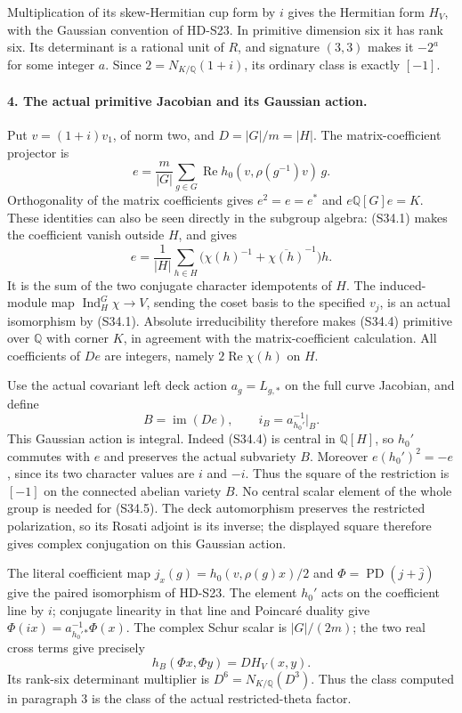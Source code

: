 Multiplication of its skew-Hermitian cup form by \(i\) gives
the Hermitian form \(H_V\), with the Gaussian convention of
HD-S23. In primitive dimension six it has rank six. Its
determinant is a rational unit of \(R\), and signature
\((3,3)\) makes it \(-2^a\) for some integer \(a\).
Since \(2=N_{K/\mathbb Q}(1+i)\), its ordinary class is
exactly \([-1]\).

\paragraph{4. The actual primitive Jacobian and its Gaussian action.}
Put \(v=(1+i)v_1\), of norm two, and \(D=|G|/m=|H|\).
The matrix-coefficient projector is
\[
 e=\frac m{|G|}\sum_{g\in G}
     \operatorname{Re}h_0(v,\rho(g^{-1})v)\,g.
 \tag{S34.3}
\]
Orthogonality of the matrix coefficients gives
\(e^2=e=e^*\) and \(e\mathbb Q[G]e=K\). These identities
can also be seen directly in the subgroup algebra: (S34.1)
makes the coefficient vanish outside \(H\), and gives
\[
 e=\frac1{|H|}\sum_{h\in H}
           \bigl(\chi(h)^{-1}+\overline{\chi(h)}^{-1}\bigr)h.
 \tag{S34.4}
\]
It is the sum of the two conjugate character idempotents of
\(H\). The induced-module map
\(\operatorname{Ind}_H^G\chi\to V\), sending the coset basis
to the specified \(v_j\), is an actual isomorphism by (S34.1).
Absolute irreducibility therefore makes (S34.4) primitive over
\(\mathbb Q\) with corner \(K\), in agreement with the
matrix-coefficient calculation. All coefficients of \(De\)
are integers, namely \(2\operatorname{Re}\chi(h)\) on \(H\).

Use the actual covariant left deck action \(a_g=L_{g,*}\) on
the full curve Jacobian, and define
\[
 B=\operatorname{im}(De),\qquad
                      i_B=a_{h_0'}^{-1}|_B.
 \tag{S34.5}
\]
This Gaussian action is integral. Indeed (S34.4) is central in
\(\mathbb Q[H]\), so \(h_0'\) commutes with \(e\) and
preserves the actual subvariety \(B\). Moreover
\(e(h_0')^2=-e\), since its two character values are \(i\)
and \(-i\). Thus the square of the restriction is \([-1]\)
on the connected abelian variety \(B\). No central scalar
element of the whole group is needed for (S34.5).
The deck automorphism preserves the restricted polarization,
so its Rosati adjoint is its inverse; the displayed square
therefore gives complex conjugation on this Gaussian action.

The literal coefficient map
\(j_x(g)=h_0(v,\rho(g)x)/2\) and
\(\Phi=\operatorname{PD}(j+\bar j)\) give the paired
isomorphism of HD-S23. The element \(h_0'\) acts on the
coefficient line by \(i\); conjugate linearity in that line
and Poincar\'e duality give
\(\Phi(ix)=a_{h_0'}^{-1}{}_\ast\Phi(x)\).
The complex Schur scalar is \(|G|/(2m)\); the two real cross
terms give precisely
\[
                         h_B(\Phi x,\Phi y)=D H_V(x,y).
 \tag{S34.6}
\]
Its rank-six determinant multiplier is
\(D^6=N_{K/\mathbb Q}(D^3)\). Thus the class computed in
paragraph 3 is the class of the actual restricted-theta factor.

